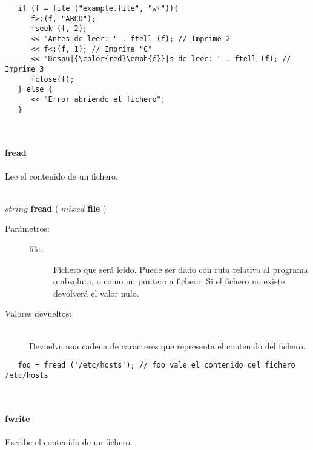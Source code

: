\begin{lstlisting}  
   if (f = file ("example.file", "w+")){
      f>:(f, "ABCD");
      fseek (f, 2);
      << "Antes de leer: " . ftell (f); // Imprime 2
      << f<:(f, 1); // Imprime "C"
      << "Despu|{\color{red}\emph{é}}|s de leer: " . ftell (f); // Imprime 3
      fclose(f);
   } else {
      << "Error abriendo el fichero";
   }
\end{lstlisting}
\hfill\\ 

\paragraph{fread}
Lee el contenido de un fichero.

\hfill \\ $string$ \textbf{fread} ( $mixed$ \textbf{file}  )  
\begin{description}
\item [Parámetros:] \hfill 
   \begin{description}
   \item[file:] Fichero que será leído. Puede ser dado con ruta relativa al programa o absoluta, o como un puntero a fichero. Si el fichero no existe
   devolverá el valor nulo.
   \end{description}
\item[Valores devueltos:] \hfill \\
   Devuelve una cadena de caracteres que representa el contenido del fichero.
\end{description}

\begin{lstlisting}  
   foo = fread ('/etc/hosts'); // foo vale el contenido del fichero /etc/hosts
\end{lstlisting}
\hfill\\ 

\paragraph{fwrite}
Escribe el contenido de un fichero.

